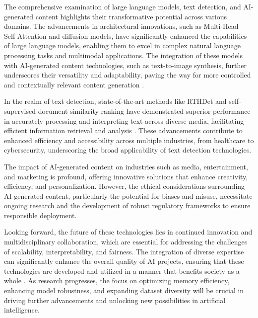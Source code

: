 The comprehensive examination of large language models, text detection, and AI-generated content highlights their transformative potential across various domains. The advancements in architectural innovations, such as Multi-Head Self-Attention and diffusion models, have significantly enhanced the capabilities of large language models, enabling them to excel in complex natural language processing tasks and multimodal applications. The integration of these models with AI-generated content technologies, such as text-to-image synthesis, further underscores their versatility and adaptability, paving the way for more controlled and contextually relevant content generation \cite{gao2023benefitslabeldescriptiontrainingzeroshot}.



In the realm of text detection, state-of-the-art methods like RTHDet and self-supervised document similarity ranking have demonstrated superior performance in accurately processing and interpreting text across diverse media, facilitating efficient information retrieval and analysis \cite{ginzburg2021selfsuperviseddocumentsimilarityranking}. These advancements contribute to enhanced efficiency and accessibility across multiple industries, from healthcare to cybersecurity, underscoring the broad applicability of text detection technologies.



The impact of AI-generated content on industries such as media, entertainment, and marketing is profound, offering innovative solutions that enhance creativity, efficiency, and personalization. However, the ethical considerations surrounding AI-generated content, particularly the potential for biases and misuse, necessitate ongoing research and the development of robust regulatory frameworks to ensure responsible deployment.



Looking forward, the future of these technologies lies in continued innovation and multidisciplinary collaboration, which are essential for addressing the challenges of scalability, interpretability, and fairness. The integration of diverse expertise can significantly enhance the overall quality of AI projects, ensuring that these technologies are developed and utilized in a manner that benefits society as a whole \cite{korre2023takesvillagemultidisciplinaritycollaboration}. As research progresses, the focus on optimizing memory efficiency, enhancing model robustness, and expanding dataset diversity will be crucial in driving further advancements and unlocking new possibilities in artificial intelligence.